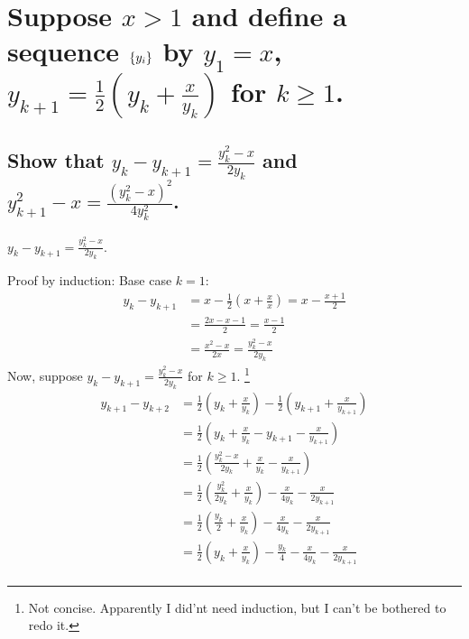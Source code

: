 \documentclass[10pt, letterpaper, titlepage]{article}
\begin{document}
    \newpage
    \section{Suppose $x > 1$ and define a sequence $\{ y_i \}$ 
      by $y_1 = x$, $y_{k+1} = \frac{1}{2} (y_k + \frac{x}{y_k})$ for $k \geq 1$.}

      \subsection{Show that $y_k - y_{k+1} = \frac{y_k^2 -x}{2y_k}$ and 
        $y_{k+1}^2 - x = \frac{(y_k^2 - x)^2}{4y_k^2}$.}
        \begin{multicols}{2}
          \begin{proposition}
            $y_k - y_{k+1} = \frac{y_k^2 -x}{2y_k}$.
          \end{proposition}
            Proof by induction:
            Base case $k = 1$:
            \begin{align*}
              y_k - y_{k+1}
              &= x - \frac{1}{2}(x+\frac{x}{x})
              = x - \frac{x + 1}{2} \\ 
              &= \frac{2x - x - 1}{2}
              = \frac{x-1}{2} \\ 
              &= \frac{x^2 - x}{2x}
              = \frac{y_k^2 - x}{2y_k}
            \end{align*}
            Now, suppose $y_k - y_{k+1} = \frac{y_k^2 - x}{2y_k}$ for $k \geq 1$.
            \footnote{Not concise. 
              Apparently I did'nt need induction, but I can't be bothered to redo it.}
            \begin{align*}
              y_{k+1} - y_{k+2}
              &= \frac{1}{2} (y_{k} + \frac{x}{y_{k}}) - \frac{1}{2} (y_{k+1} + \frac{x}{y_{k+1}}) \\ 
              &= \frac{1}{2} (y_{k} + \frac{x}{y_{k}} - y_{k+1} - \frac{x}{y_{k+1}}) \\ 
              &= \frac{1}{2} (\frac{y_k^2 - x}{2y_k} + \frac{x}{y_{k}} - \frac{x}{y_{k+1}}) \\ 
              &= \frac{1}{2} (\frac{y_k^2}{2y_k} + \frac{x}{y_{k}}) - \frac{x}{4y_k} - \frac{x}{2y_{k+1}} \\ 
              &= \frac{1}{2} (\frac{y_k}{2} + \frac{x}{y_{k}}) - \frac{x}{4y_k} - \frac{x}{2y_{k+1}} \\ 
              &= \frac{1}{2} (y_k + \frac{x}{y_{k}})- \frac{y_k}{4} - \frac{x}{4y_k} - \frac{x}{2y_{k+1}} \\ 

\end{align*}
\end{multicols}
\end{document}
